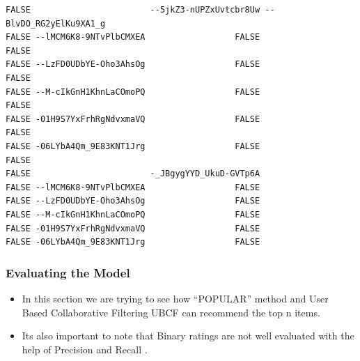 \documentclass[]{article}
\newenvironment{Shaded}{\begin{snugshade}}{\end{snugshade}}
\newcommand{\DecValTok}[1]{\textcolor[rgb]{0.00,0.00,0.81}{#1}}
\newcommand{\KeywordTok}[1]{\textcolor[rgb]{0.13,0.29,0.53}{\textbf{#1}}}
\newcommand{\NormalTok}[1]{#1}
\newcommand{\OperatorTok}[1]{\textcolor[rgb]{0.81,0.36,0.00}{\textbf{#1}}}
\newcommand{\StringTok}[1]{\textcolor[rgb]{0.31,0.60,0.02}{#1}}
\providecommand{\tightlist}{%
  \setlength{\itemsep}{0pt}\setlength{\parskip}{0pt}}
\begin{document}
\begin{Shaded}
\begin{Highlighting}[]
{{\KeywordTok{head}\NormalTok{(}\KeywordTok{as}\NormalTok{(dat_binaryRatingMatrix[}\DecValTok{1}\OperatorTok{:}\DecValTok{5}\NormalTok{, }\DecValTok{1}\OperatorTok{:}\DecValTok{3}\NormalTok{], }\StringTok{"matrix"}\NormalTok{))}
\end{Highlighting}
\end{Shaded}

\begin{verbatim}
FALSE                        --5jkZ3-nUPZxUvtcbr8Uw --BlvDO_RG2yElKu9XA1_g
FALSE --lMCM6K8-9NTvPlbCMXEA                  FALSE                  FALSE
FALSE --LzFD0UDbYE-Oho3AhsOg                  FALSE                  FALSE
FALSE --M-cIkGnH1KhnLaCOmoPQ                  FALSE                  FALSE
FALSE -01H9S7YxFrhRgNdvxmaVQ                  FALSE                  FALSE
FALSE -06LYbA4Qm_9E83KNT1Jrg                  FALSE                  FALSE
FALSE                        -_JBgygYYD_UkuD-GVTp6A
FALSE --lMCM6K8-9NTvPlbCMXEA                  FALSE
FALSE --LzFD0UDbYE-Oho3AhsOg                  FALSE
FALSE --M-cIkGnH1KhnLaCOmoPQ                  FALSE
FALSE -01H9S7YxFrhRgNdvxmaVQ                  FALSE
FALSE -06LYbA4Qm_9E83KNT1Jrg                  FALSE
\end{verbatim}

\hypertarget{evaluating-the-model}{%
\subsubsection{Evaluating the Model}\label{evaluating-the-model}}

\begin{itemize}
\tightlist
\item
  In this section we are trying to see how ``POPULAR'' method and User
  Based Collaborative Filtering UBCF can recommend the top n items.
\item
  Its also important to note that Binary ratings are not well evaluated
  with the help of Precision and Recall .
\end{itemize}
\end{document}
